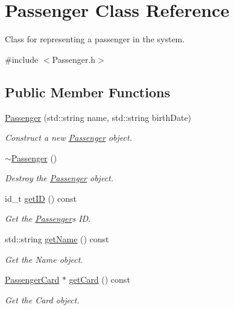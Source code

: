 \hypertarget{classPassenger}{}\section{Passenger Class Reference}
\label{classPassenger}


Class for representing a passenger in the system.  




{\ttfamily \#include $<$Passenger.\+h$>$}

\subsection*{Public Member Functions}
\begin{DoxyCompactItemize}
\item 
\mbox{\hyperlink{classPassenger_a895d7a9cfd358b566ed78e0d81d37bff}{Passenger}} (std\+::string name, std\+::string birth\+Date)
\begin{DoxyCompactList}\small\item\em Construct a new \mbox{\hyperlink{classPassenger}{Passenger}} object. \end{DoxyCompactList}\item 
\mbox{\hyperlink{classPassenger_a6a6747cafd45d2c85db2ec4e873be3c7}{$\sim$\+Passenger}} ()
\begin{DoxyCompactList}\small\item\em Destroy the \mbox{\hyperlink{classPassenger}{Passenger}} object. \end{DoxyCompactList}\item 
id\+\_\+t \mbox{\hyperlink{classPassenger_ae6fcc19037be144f654c623c5b78ae24}{get\+ID}} () const
\begin{DoxyCompactList}\small\item\em Get the \mbox{\hyperlink{classPassenger}{Passenger}}\textquotesingle{}s ID. \end{DoxyCompactList}\item 
std\+::string \mbox{\hyperlink{classPassenger_a7c919f6947817ff1c6a4ee51923c116f}{get\+Name}} () const
\begin{DoxyCompactList}\small\item\em Get the Name object. \end{DoxyCompactList}\item 
\mbox{\hyperlink{classPassengerCard}{Passenger\+Card}} $\ast$ \mbox{\hyperlink{classPassenger_ae8d5310db80438702dec5f4d649289f1}{get\+Card}} () const
\begin{DoxyCompactList}\small\item\em Get the Card object. \end{DoxyCompactList}\item 

\end{DoxyCompactItemize}
